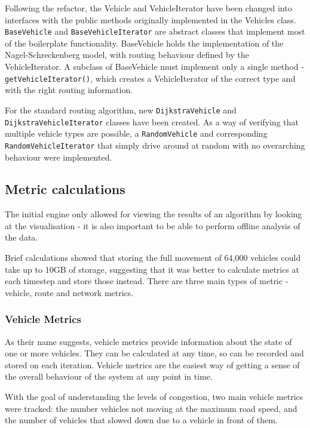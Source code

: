 \documentclass[ %
                    author={Alexander Hill},
                supervisor={Dr. Benjamin Sach},
                    degree={MEng},
                     title={MARMOSET},
                  subtitle={Multi-Agent Route Management using Online Simulation for Efficient Transportation},
                      type={research},
                      year={2016} ]{dissertation}
\begin{document}
Following the refactor, the Vehicle and VehicleIterator have been changed into
interfaces with the public methods originally implemented in the Vehicles class.
\texttt{BaseVehicle} and \texttt{BaseVehicleIterator} are abstract classes that
implement most of the boilerplate functionality. BaseVehicle holds the
implementation of the Nagel-Schreckenberg model, with routing behaviour defined
by the VehicleIterator. A subclass of BaseVehicle must implement only a single
method - \texttt{getVehicleIterator()}, which creates a VehicleIterator of the
correct type and with the right routing information.

For the standard routing algorithm, new \texttt{DijkstraVehicle} and
\texttt{DijkstraVehicleIterator} classes have been created. As a way of
verifying that multiple vehicle types are possible, a \texttt{RandomVehicle} and
corresponding \texttt{RandomVehicleIterator} that simply drive around at random
with no overarching behaviour were implemented.

\subsection{Metric calculations}

The initial engine only allowed for viewing the results of an algorithm by
looking at the visualisation - it is also important to be able to perform
offline analysis of the data.

Brief calculations showed that storing the full movement of 64,000 vehicles
could take up to 10GB of storage, suggesting that it was better to calculate
metrics at each timestep and store those instead. There are three main types of
metric - vehicle, route and network metrics.

\subsubsection{Vehicle Metrics}

As their name suggests, vehicle metrics provide information about the state of
one or more vehicles. They can be calculated at any time, so can be recorded and
stored on each iteration. Vehicle metrics are the easiest way of getting a sense
of the overall behaviour of the system at any point in time.

With the goal of understanding the levels of congestion, two main
vehicle metrics were tracked: the number vehicles not moving at the maximum road speed, and
the number of vehicles that slowed down due to a vehicle in front of them.
\end{document}
